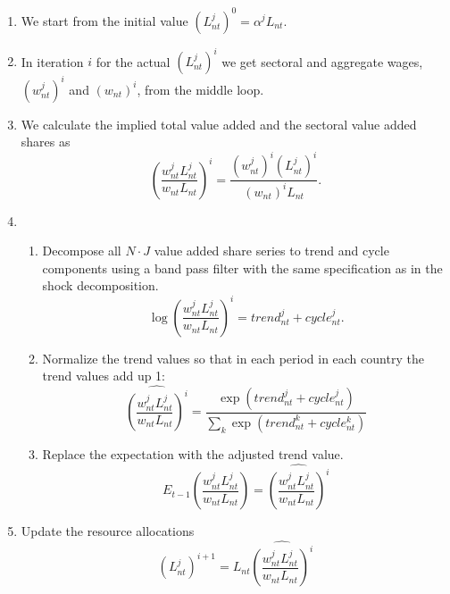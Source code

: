 \documentclass[11pt,oneside,a4paper]{article}
\begin{document}
\begin{enumerate}
  \item We start from the initial value $(L_{nt}^j)^0 = \alpha^j L_{nt}$.
  \item In iteration $i$ for the actual $(L_{nt}^j)^i$ we get sectoral and aggregate wages, $(w_{nt}^j)^i$ and $(w_{nt})^i$, from the middle loop.
  \item We calculate the implied total value added and the sectoral value added shares as
    $$\left(\frac{w_{nt}^j L_{nt}^j}{w_{nt} L_{nt}}\right)^i = \frac{(w_{nt}^j)^i (L_{nt}^j)^i}{(w_{nt})^i L_{nt}}.$$
  \item
    \begin{enumerate}
      \item Decompose all $N \cdot J$ value added share series to trend and cycle components using a band pass filter with the same specification as in the shock decomposition.
        $$\log\left(\frac{w_{nt}^j L_{nt}^j}{w_{nt} L_{nt}}\right)^i = trend^j_{nt} + cycle_{nt}^j.$$
      \item Normalize the trend values so that in each period in each country the trend values add up 1:
        $$\widehat{\left(\frac{w_{nt}^j L_{nt}^j}{w_{nt} L_{nt}}\right)^i} = \frac{\exp(trend^j_{nt} + cycle_{nt}^j)}{\sum_k \exp(trend^k_{nt} + cycle_{nt}^k)}$$
      \item Replace the expectation with the adjusted trend value.
      $$E_{t - 1} \left( \frac{w_{nt}^j L_{nt}^j}{w_{nt} L_{nt}}\right) = \widehat{\left(\frac{w_{nt}^j L_{nt}^j}{w_{nt} L_{nt}}\right)^i}$$
    \end{enumerate} 
  \item Update the resource allocations
    $$(L_{nt}^j)^{i + 1} = L_{nt} \widehat{\left(\frac{w_{nt}^j L_{nt}^j}{w_{nt} L_{nt}}\right)^i}$$
\end{enumerate}
\end{document}
